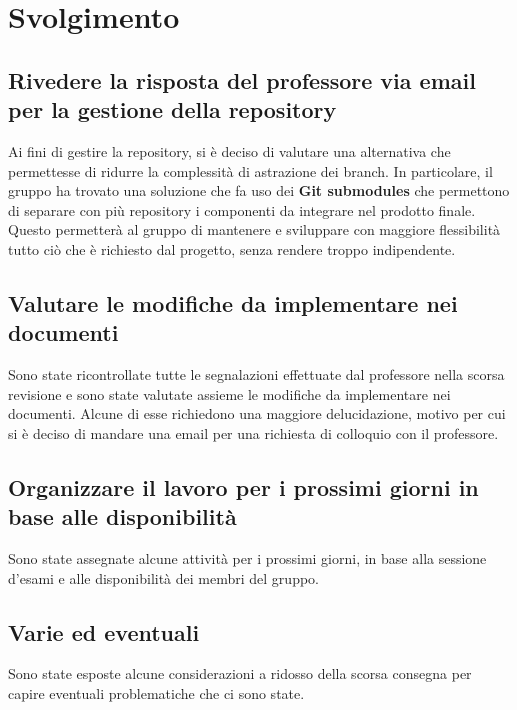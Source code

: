 \newpage
\section*{Svolgimento}

	\subsection*{Rivedere la risposta del professore via email per la gestione della repository}
		Ai fini di gestire la repository, si è deciso di valutare una alternativa che permettesse di ridurre la complessità di astrazione dei branch. In particolare, il gruppo ha trovato una soluzione che fa uso dei \textbf{Git submodules} che permettono di separare con più repository i componenti da integrare nel prodotto finale. Questo permetterà al gruppo di mantenere e sviluppare con maggiore flessibilità tutto ciò che è richiesto dal progetto, senza rendere troppo indipendente.

	\subsection*{Valutare le modifiche da implementare nei documenti}
		Sono state ricontrollate tutte le segnalazioni effettuate dal professore nella scorsa revisione e sono state valutate assieme le modifiche da implementare nei documenti. Alcune di esse richiedono una maggiore delucidazione, motivo per cui si è deciso di mandare una email per una richiesta di colloquio con il professore.

	\subsection*{Organizzare il lavoro per i prossimi giorni in base alle disponibilità}
		Sono state assegnate alcune attività per i prossimi giorni, in base alla sessione d'esami e alle disponibilità dei membri del gruppo.

	\subsection*{Varie ed eventuali}
		Sono state esposte alcune considerazioni a ridosso della scorsa consegna per capire eventuali problematiche che ci sono state.